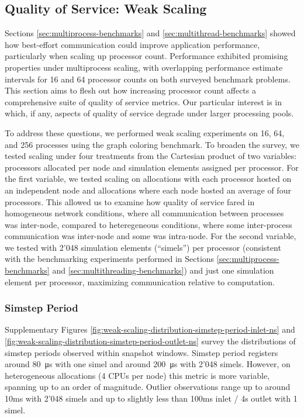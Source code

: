 \subsection{Quality of Service: Weak Scaling} \label{sec:weak-scaling}

Sections \ref{sec:multiprocess-benchmarks} and \ref{sec:multithread-benchmarks} showed how best-effort communication could improve application performance, particularly when scaling up processor count.
Performance exhibited promising properties under multiprocess scaling, with overlapping performance estimate intervals for 16 and 64 processor counts on both surveyed benchmark problems.
This section aims to flesh out how increasing processor count affects a comprehensive suite of quality of service metrics.
Our particular interest is in which, if any, aspects of quality of service degrade under larger processing pools.

To address these questions, we performed weak scaling experiments on 16, 64, and 256 processes using the graph coloring benchmark.
To broaden the survey, we tested scaling under four treatments from the Cartesian product of two variables: processors allocated per node and simulation elements assigned per processor.
For the first variable, we tested scaling on allocations with each processor hosted on an independent node and allocations where each node hosted an average of four processors.
This allowed us to examine how quality of service fared in homogeneous network conditions, where all communication between processes was inter-node, compared to heteregeneous conditions, where some inter-process communication was inter-node and some was intra-node.
For the second variable, we tested with 2'048 simulation elements (``simels'') per processor (consistent with the benchmarking experiments performed in Sections \ref{sec:multiprocess-benchmarks} and \ref{sec:multithreading-benchmarks}) and just one simulation element per processor, maximizing communication relative to computation.

\subsubsection{Simstep Period}

Supplementary Figures \ref{fig:weak-scaling-distribution-simstep-period-inlet-ns} and \ref{fig:weak-scaling-distribution-simstep-period-outlet-ns} survey the distributions of simstep periods observed within snapshot windows.
Simstep period registers around \SI{80}{\micro\second} with one simel and around \SI{200}{\micro\second} with 2'048 simels.
However, on heterogeneous allocations (4 CPUs per node) this metric is more variable, spanning up to an order of magnitude.
Outlier observations range up to around 10ms with 2'048 simels and up to slightly less than 100ms inlet / 4s outlet with 1 simel.

